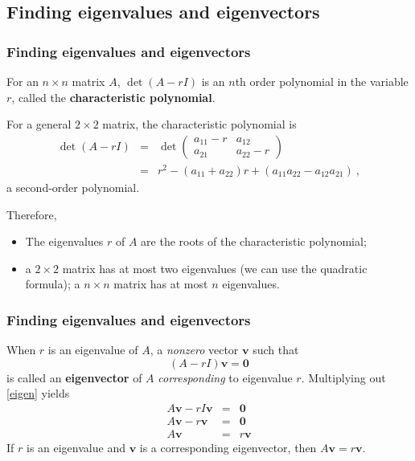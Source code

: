 \documentclass[10pt, handout]{beamer}
\begin{document}
\subsection{Finding eigenvalues and eigenvectors}
\begin{frame}
\frametitle{Finding eigenvalues and eigenvectors}
For an $n \times n$ matrix $A$, $\det (A - r I)$ is an $n$th order polynomial in the variable $r$, called the \textbf{characteristic polynomial}.

\begin{example}
For a general $2 \times 2$ matrix, the characteristic polynomial is 
\begin{eqnarray} \nonumber 
\det(A - r I) &=& \det \begin{pmatrix} a_{11} - r & a_{12} \\ a_{21} & a_{22} - r\end{pmatrix} \\ \label{characpoly}
&=& r^2 - (a_{11} + a_{22})r + (a_{11}a_{22} - a_{12}a_{21}) ~,
\end{eqnarray}
a second-order polynomial. 
\end{example}
Therefore,
\begin{itemize}  
\item The eigenvalues $r$ of $A$ are the roots of the characteristic polynomial;
\item a $2 \times 2$ matrix has at most two eigenvalues (we can use the quadratic formula);  a $n \times n$ matrix has at most $n$ eigenvalues.
\end{itemize}

\end{frame}


\begin{frame}
\frametitle{Finding eigenvalues and eigenvectors}
When $r$ is an eigenvalue of $A$, a \textit{nonzero} vector $\mathbf{v}$ such that \begin{equation}\label{eigen} 
(A - r I)\mathbf{v} = \mathbf{0} 
\end{equation} 
is called an \textbf{eigenvector} of $A$ \textit{corresponding} to eigenvalue $r$. Multiplying out \eqref{eigen} yields
\begin{eqnarray}\nonumber
A\mathbf{v} - r I\mathbf{v} &=& \mathbf{0} \\  \nonumber
A\mathbf{v} - r \mathbf{v} &=& \mathbf{0} \\  \nonumber
A\mathbf{v} &=& r \mathbf{v} 
\end{eqnarray}
If $r$ is an eigenvalue and $\mathbf{v}$ is a corresponding eigenvector, then $A\mathbf{v} = r \mathbf{v}$.

\end{frame}
\end{document}
